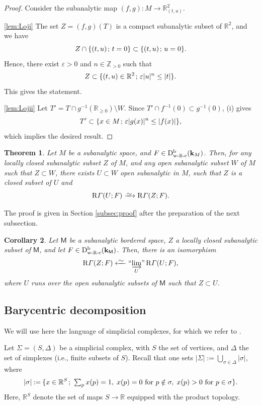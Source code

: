 \documentclass[JEP,XML,SOM,Unicode]{cedram}
\newcommand{\isom}{\xrightarrow{{\raisebox{-.6ex}[0ex][0ex]{$\mspace{1mu}\textstyle\sim\mspace{2mu}$}}}}
\newcommand{\isofrom}[1][]{\xleftarrow[#1]%
{\raisebox{-.4ex}[0ex][-.4ex]{$\mspace{2mu}\sim\mspace{2mu}$}}}
\newcommand{\semicolon}{\nobreak \mskip2mu\mathpunct{}\nonscript\mkern-\thinmuskip{;}\mskip6mu plus1mu\relax}
\theoremstyle{plain}
\newtheorem{theorem}{Theorem}[section]
\newtheorem{corollary}[theorem]{Corollary}
\theoremstyle{definition}
\newcommand{\R}{\mathbb{R}}
\newcommand{\Z}{\mathbb{Z}}
\newcommand{\derived}[1]{\mathrm{#1}}
\newcommand{\derd}{\derived{D}}
\newcommand{\derr}{\derived{R}}
\newcommand{\BDC}{\derd^{\mathrm{b}}}
\newcommand{\wRc}{{\mathrm{w}\text-\R\text-\mathrm{c}}}
\newcommand{\field}{\mathbf{k}}\let\cor\field
\newcommand{\rsect}{\derr\varGamma}
\newcommand{\bbM}{\mathsf{M}}
\newcommand{\defeq}{\mathbin{:=}}\let \seteq\defeq
\newcommand{\indlim}[1][]{\mathop{\text{\rm``$\varinjlim$''}}\limits_{#1}}
\newcommand{\st}[1]{{\{{#1}\}}}
\newcommand{\opb}[1]{#1^{-1}}
\begin{document}
\begin{proof}
Consider the subanalytic map $(f,g)\colon M\to\R^2_{(t,u)}$.

\eqref{lem:Loji}
The set $Z=(f,g)(T)$ is a compact subanalytic subset of $\R^2$, and we have
\[
Z\cap\st{(t,u)\semicolon t=0}\subset\st{(t,u)\semicolon u=0}.
\]
Hence, there exist $\varepsilon>0$ and $n\in\Z_{>0}$ such that
\[
Z \subset \st{(t,u)\in\R^2\semicolon \varepsilon|u|^n\leq |t|}.
\]
This gives the statement.

\eqref{lem:Lojii}
Let $T'=T\cap\opb g(\R_{\geq 0})\setminus W$. Since $T'\cap\opb f(0)\subset\opb g(0)$, (i) gives
\[
T'\subset\st{x\in M\semicolon \varepsilon|g(x)|^n \leq |f(x)|},
\]
which implies the desired result.
\end{proof}

\begin{theorem}\label{th:subanalytic ext}
Let $M$ be a subanalytic space, and $F\in\BDC_{\wRc}(\field_M)$.
Then, for any locally closed subanalytic subset $Z$ of $M$, and any open subanalytic subset $W$ of $M$ such that $Z\subset W$, there exists
$U\subset W$ open subanalytic in $M$, such that
$Z$ is a closed subset of $U$ and
\[
\rsect(U;F)\isom \rsect(Z;F).
\]
\end{theorem}

The proof is given in Section \ref{subsec:proof}
after the preparation of the next subsection.

\begin{corollary}\label{cor:FKU}
Let $\bbM$ be a subanalytic bordered space,
$Z$ a locally closed subanalytic subset of $\bbM$, and let $F\in\BDC_{\wRc}(\field_\bbM)$.
Then, there is an isomorphism
\[
\rsect(Z;F) \isofrom \indlim[U]\rsect(U;F),
\]
where $U$ runs over the open subanalytic subsets of $\bbM$ such that $Z\subset U$.
\end{corollary}

\subsection {Barycentric decomposition}
We will use here the language of simplicial complexes, for which we refer to \cite[\S8.1]{KS90}.

Let $\Sigma=(S,\Delta)$ be a simplicial complex, with $S$ the set of vertices, and $\Delta$ the set of simplexes (i.e., finite subsets of $S$).
Recall that one sets $|\Sigma|\defeq\bigcup\nolimits_{\sigma\in\Delta}|\sigma|$, where
\[
|\sigma|\defeq\st{x\in\R^S\semicolon \textstyle\sum_p x(p)=1,\;x(p)=0\text{ for }p\notin\sigma,\; x(p)>0\text{ for }p\in\sigma }.
\]
Here, $\R^S$ denote the set of maps $S\to\R$ equipped with the product topology.
\end{document}
